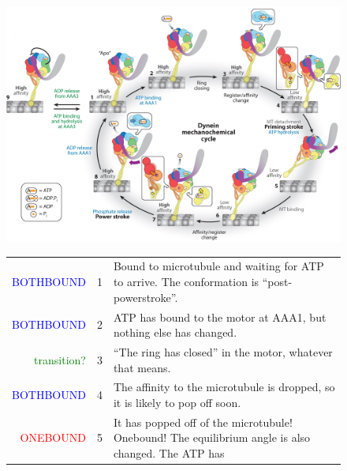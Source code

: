 \documentclass[10pt]{article} %
\begin{document}
\begin{figure}[h]
  \centering
  \includegraphics[width=.85\textwidth,keepaspectratio]{../../figures/mechanochemical-cycle.jpeg}
  \newcommand\bothbound{\textcolor{blue}{BOTHBOUND}}
  \newcommand\onebound{\textcolor{red}{ONEBOUND}}
  \newcommand\transition{\textcolor{green}{transition?}}
  \begin{tabular}{rll}
    \bothbound &
    1 & \begin{minipage}{5in}
      Bound to microtubule and waiting for ATP to arrive.  The
      conformation is ``post-powerstroke''.
    \end{minipage}\vspace{0.5em}\\
    \bothbound &
    2 & \begin{minipage}{5in}
      ATP has bound to the motor at AAA1, but nothing else has changed.
    \end{minipage}\vspace{0.5em}\\
    \transition &
    3 & \begin{minipage}{5in}
      ``The ring has closed'' in the motor, whatever that means.
    \end{minipage}\vspace{0.5em}\\
    \bothbound &
    4 & \begin{minipage}{5in}
      The affinity to the microtubule is dropped, so it is likely to pop off soon.
    \end{minipage}\vspace{0.5em}\\
    \onebound &
    5 & \begin{minipage}{5in} It has popped off of the microtubule!
      Onebound! The equilibrium angle is also changed.  The ATP has

\end{minipage}
\end{tabular}
\end{figure}
\end{document}
